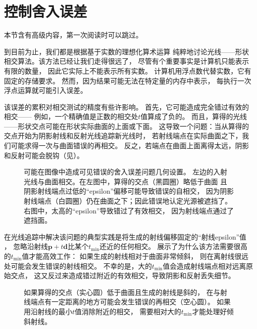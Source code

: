 \section{控制舍入误差}\label{sec:控制舍入误差}

\begin{remark}
    本节含有高级内容，第一次阅读时可以跳过。
\end{remark}

到目前为止，我们都是根据基于实数的理想化算术运算
纯粹地讨论光线——形状相交算法。该方法已经让我们走得很远了，
尽管有个重要事实是计算机只能表示有限的数量，
因此它实际上不能表示所有实数。
计算机用浮点数代替实数，它有固定的存储要求。
然而，因为结果可能无法在特定量的内存中表示，
每执行一次浮点运算就可能引入误差。

该误差的累积对相交测试的精度有些许影响。
首先，它可能造成完全错过有效的相交——
例如，一个精确值是正数的相交处$t$值算成了负的。
而且，算得的光线——形状交点可能在形状实际曲面的上面或下面。
这导致一个问题：当从算得的交点开始为阴影射线和反射光线追踪新光线时，
若射线端点在实际曲面之下，我们可能求得一次与曲面错误的再相交。
反之，若端点在曲面上面离得太远，阴影和反射可能会脱钩（见）。
\begin{figure}[htbp]
    \centering
    \caption{可能在图像中造成可见错误的舍入误差问题几何设置。
        左边的入射光线与曲面相交。在左图中，算得的交点（黑圆圈）略低于曲面
        且阴影射线端点过低的“epsilon”偏移可能导致错误的自相交，
        因为阴影射线端点（白圆圈）仍在曲面之下；因此错误地认定光源被遮挡了。
        右图中，太高的“epsilon”导致错过了有效相交，
        因为射线端点通过了遮挡面。}
    \label{fig:3.39}
\end{figure}

在光线追踪中解决该问题的典型实践是将生成的射线偏移固定的“射线epsilon”值
，
忽略沿射线$\bm p+t\bm d$比某个$t_{\min}$还近的任何相交。
展示了为什么该方法需要很高的$t_{\min}$值才能高效工作：
如果生成的射线相对于曲面非常倾斜，
则在离射线很远处可能会发生错误的射线相交。
不幸的是，大的$t_{\min}$值会造成射线端点相对远离原始交点，
这又反过来造成错过附近的有效相交，导致阴影和反射丢失细节。
\begin{figure}[htbp]
    \centering
    \caption{如果算得的交点（实心圆）低于曲面且生成的射线是斜的，
        在与射线端点有一定距离的地方可能会发生错误的再相交（空心圆）。
        如果用沿射线的最小$t$值消除附近的相交，
        需要相对大的$t_{\min}$才能处理好倾斜射线。}
    \label{fig:3.40}
\end{figure}

